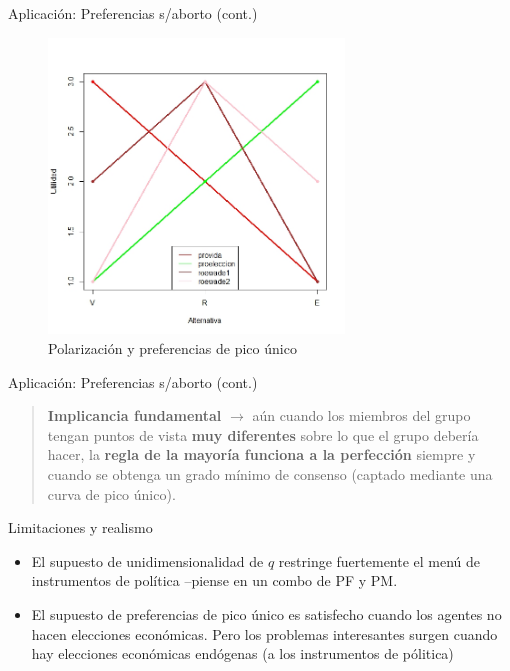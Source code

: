 \documentclass[
  ignorenonframetext,
]{beamer}
\providecommand{\tightlist}{%
  \setlength{\itemsep}{0pt}\setlength{\parskip}{0pt}}\usepackage{longtable,booktabs,array}
\begin{document}
\begin{frame}
\begin{block}{Aplicación: Preferencias s/aborto (cont.)}
\protect\hypertarget{aplicaciuxf3n-preferencias-saborto-cont.}{}
\begin{figure}

{\centering \includegraphics[width=0.7\textwidth,height=\textheight]{../epol/fig/fig-02-012.jpeg}

}

\caption{Polarización y preferencias de pico único}

\end{figure}
\end{block}

\begin{block}{Aplicación: Preferencias s/aborto (cont.)}
\protect\hypertarget{aplicaciuxf3n-preferencias-saborto-cont.-1}{}
\begin{quote}
\textbf{Implicancia fundamental} \(\longrightarrow\) aún cuando los
miembros del grupo tengan puntos de vista \textbf{muy diferentes} sobre
lo que el grupo debería hacer, la \textbf{regla de la mayoría funciona a
la perfección} siempre y cuando se obtenga un grado mínimo de consenso
(captado mediante una curva de pico único).
\end{quote}
\end{block}

\begin{block}{Limitaciones y realismo}
\protect\hypertarget{limitaciones-y-realismo}{}
\begin{itemize}
\tightlist
\item
  El supuesto de unidimensionalidad de \(q\) restringe fuertemente el
  menú de instrumentos de política --piense en un combo de PF y PM.
\item
  El supuesto de preferencias de pico único es satisfecho cuando los
  agentes no hacen elecciones económicas. Pero los problemas
  interesantes surgen cuando hay elecciones económicas endógenas (a los
  instrumentos de pólitica)


\end{itemize}
\end{block}
\end{frame}
\end{document}

